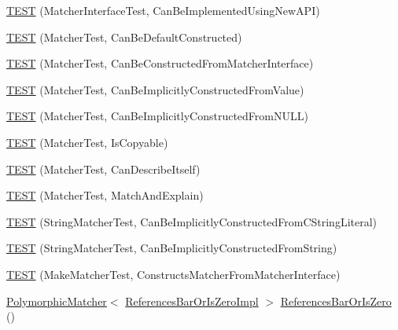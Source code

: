 \begin{DoxyCompactItemize}
\item 
\hyperlink{namespacetesting_1_1gmock__matchers__test_ad212c5ac3ef7a102a6b1712e40e06a1e}{T\+E\+ST} (Matcher\+Interface\+Test, Can\+Be\+Implemented\+Using\+New\+A\+PI)
\item 
\hyperlink{namespacetesting_1_1gmock__matchers__test_a8843a1545b9e09d73b565cf94f2e5f8b}{T\+E\+ST} (Matcher\+Test, Can\+Be\+Default\+Constructed)
\item 
\hyperlink{namespacetesting_1_1gmock__matchers__test_a3dee288df7e811f817850a5187c42669}{T\+E\+ST} (Matcher\+Test, Can\+Be\+Constructed\+From\+Matcher\+Interface)
\item 
\hyperlink{namespacetesting_1_1gmock__matchers__test_a2bd9ad37a8b9f03b10a15ed322c3249c}{T\+E\+ST} (Matcher\+Test, Can\+Be\+Implicitly\+Constructed\+From\+Value)
\item 
\hyperlink{namespacetesting_1_1gmock__matchers__test_a0de94b029c8a13180276e411f4d75f7f}{T\+E\+ST} (Matcher\+Test, Can\+Be\+Implicitly\+Constructed\+From\+N\+U\+LL)
\item 
\hyperlink{namespacetesting_1_1gmock__matchers__test_ab37bd0e535503a8f39e34b0554b2fb28}{T\+E\+ST} (Matcher\+Test, Is\+Copyable)
\item 
\hyperlink{namespacetesting_1_1gmock__matchers__test_ae85f2ec21822e884ac9ff58741d420d2}{T\+E\+ST} (Matcher\+Test, Can\+Describe\+Itself)
\item 
\hyperlink{namespacetesting_1_1gmock__matchers__test_aee6cef32b22ddd6ce8b87578c3de4198}{T\+E\+ST} (Matcher\+Test, Match\+And\+Explain)
\item 
\hyperlink{namespacetesting_1_1gmock__matchers__test_a17fb479932a88dc4e334327c5e12c8d6}{T\+E\+ST} (String\+Matcher\+Test, Can\+Be\+Implicitly\+Constructed\+From\+C\+String\+Literal)
\item 
\hyperlink{namespacetesting_1_1gmock__matchers__test_a6786eca17f1fc4d6250470cc21ec79f1}{T\+E\+ST} (String\+Matcher\+Test, Can\+Be\+Implicitly\+Constructed\+From\+String)
\item 
\hyperlink{namespacetesting_1_1gmock__matchers__test_ae433e93168010d7316b40ef4a5088d09}{T\+E\+ST} (Make\+Matcher\+Test, Constructs\+Matcher\+From\+Matcher\+Interface)
\item 
\hyperlink{classtesting_1_1PolymorphicMatcher}{Polymorphic\+Matcher}$<$ \hyperlink{classtesting_1_1gmock__matchers__test_1_1ReferencesBarOrIsZeroImpl}{References\+Bar\+Or\+Is\+Zero\+Impl} $>$ \hyperlink{namespacetesting_1_1gmock__matchers__test_ac07376a5dff45a905b7eb96e621ce3aa}{References\+Bar\+Or\+Is\+Zero} ()
\item 

\end{DoxyCompactItemize}
